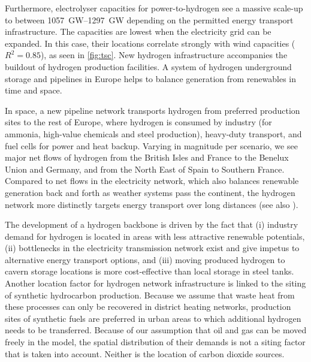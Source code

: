 
Furthermore, electrolyser capacities for power-to-hydrogen see a massive
scale-up to between \SIrange{1057}{1297}{\giga\watt} depending on the permitted
energy transport infrastructure. The capacities are lowest when the electricity
grid can be expanded. In this case, their locations correlate strongly with wind
capacities ($R^2=0.85$), as seen in \cref{fig:tsc}. New hydrogen infrastructure
accompanies the buildout of hydrogen production facilities. A system of hydrogen
underground storage and pipelines in Europe helps to balance generation from
renewables in time and space.


In space, a new pipeline network transports hydrogen from preferred production
sites to the rest of Europe, where hydrogen is consumed by industry (for
ammonia, high-value chemicals and steel production), heavy-duty transport, and
fuel cells for power and heat backup. Varying in magnitude per scenario, we see
major net flows of hydrogen from the British Isles and France to the Benelux Union and
Germany, and from the North East of Spain to Southern France.
Compared to net flows in the electricity network, which also balances renewable
generation back and forth as weather systems pass the continent, the hydrogen
network more distinctly targets energy transport over long distances (see also
).



The development of a hydrogen backbone is driven by the fact that (i) industry
demand for hydrogen is located in areas with less attractive renewable
potentials, (ii) bottlenecks in the electricity transmission network exist and
give impetus to alternative energy transport options, and (iii) moving produced
hydrogen to cavern storage locations is more cost-effective than local storage
in steel tanks. Another location factor for hydrogen network infrastructure is
linked to the siting of synthetic hydrocarbon production. Because we assume that
waste heat from these processes can only be recovered in district heating
networks, production sites of synthetic fuels are preferred in urban areas to
which additional hydrogen needs to be transferred. Because of our assumption
that oil and gas can be moved freely in the model, the spatial distribution of
their demands is not a siting factor that is taken into account. Neither is the
location of carbon dioxide sources.

